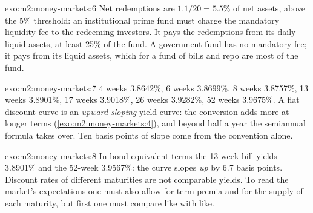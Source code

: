 \begin{solution}{exo:m2:money-markets:6}
Net redemptions are $1.1/20 = 5.5\%$ of net assets, above the 5\% threshold: an
institutional prime fund must charge the mandatory liquidity fee to the
redeeming investors. It pays the redemptions from its daily liquid assets, at
least 25\% of the fund. A government fund has no mandatory fee; it pays from
its liquid assets, which for a fund of bills and repo are most of the fund.
\end{solution}

\begin{solution}{exo:m2:money-markets:7}
4 weeks 3.8642\%, 6 weeks 3.8699\%, 8 weeks 3.8757\%, 13 weeks 3.8901\%, 17
weeks 3.9018\%, 26 weeks 3.9282\%, 52 weeks 3.9675\%. A flat discount curve
is an \emph{upward-sloping} yield curve: the conversion adds more at longer
terms (\cref{exo:m2:money-markets:4}), and beyond half a year the
semiannual formula takes over. Ten basis points of slope come from the
convention alone.
\end{solution}

\begin{solution}{exo:m2:money-markets:8}
In bond-equivalent terms the 13-week bill yields 3.8901\% and the 52-week
3.9567\%: the curve slopes \emph{up} by 6.7 basis points. Discount rates of
different maturities are not comparable yields. To read the market's
expectations one must also allow for term premia and for the supply of each
maturity, but first one must compare like with like.
\end{solution}

